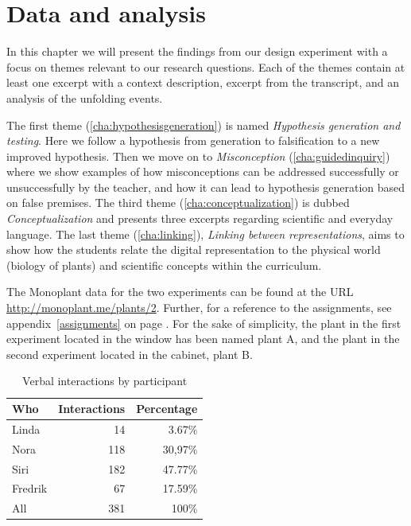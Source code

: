 \chapter{Data and analysis}
In this chapter we will present the findings from our design experiment with a focus on themes relevant to our research questions. Each of the themes contain at least one excerpt with a context description, excerpt from the transcript, and an analysis of the unfolding events. 

The first theme (\ref{cha:hypothesisgeneration}) is named \textit{Hypothesis generation and testing}. Here we follow a hypothesis from generation to falsification to a new improved hypothesis. Then we move on to \textit{Misconception} (\ref{cha:guidedinquiry}) where we show examples of how misconceptions can be addressed successfully or unsuccessfully by the teacher, and how it can lead to hypothesis generation based on false premises. The third theme (\ref{cha:conceptualization}) is dubbed \textit{Conceptualization} and presents three excerpts regarding scientific and everyday language. The last theme (\ref{cha:linking}), \textit{Linking between representations}, aims to show how the students relate the digital representation to the physical world (biology of plants) and scientific concepts within the curriculum.  

The Monoplant data for the two experiments can be found at the URL \url{http://monoplant.me/plants/2}. Further, for a reference to the assignments, see appendix~\ref{assignments} on page \pageref{assignments}. For the sake of simplicity, the plant in the first experiment located in the window has been named plant A, and the plant in the second experiment located in the cabinet, plant B.


\begin{table}[H]
\begin{center}
	\begin{tabular}{l r r } \toprule
	Who &  Interactions  & Percentage\\ \midrule  
	Linda &	 14  & 3.67\% \\
	Nora&	118 & 30,97\% \\ 
	Siri& 	182 & 47.77\% \\
	Fredrik& 67 & 17.59\% \\ \midrule
	All &	381 & 100\%\\
	\bottomrule
	\end{tabular}
\end{center}
\caption{Verbal interactions by participant}
\end{table}


